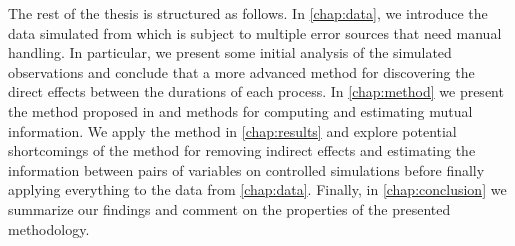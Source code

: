 \documentclass[../Thesis.tex]{subfiles}
\begin{document}
The rest of the thesis is structured as follows. In \autoref{chap:data}, we introduce the data simulated from \cite{benchmark-model-to-generate-batch-process-data} which is subject to multiple error sources that need manual handling. In particular, we present some initial analysis of the simulated observations and conclude that a more advanced method for discovering the direct effects between the durations of each process. In \autoref{chap:method} we present the method proposed in \cite{Network-deconvolution-as-a-general-method-to-distinguish-direct-dependencies-in-networks} and methods for computing and estimating mutual information. We apply the method in \autoref{chap:results} and explore potential shortcomings of the method for removing indirect effects and estimating the information between pairs of variables on controlled simulations before finally applying everything to the data from \autoref{chap:data}. Finally, in \autoref{chap:conclusion} we summarize our findings and comment on the properties of the presented methodology.







\end{document}
